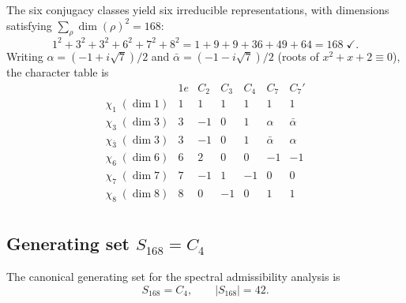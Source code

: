 \documentclass[11pt,a4paper]{article}
\begin{document}
    The six conjugacy classes yield six irreducible representations, with dimensions
    satisfying $\sum_\rho \dim(\rho)^2 = 168$:
    \begin{equation}
      1^2 + 3^2 + 3^2 + 6^2 + 7^2 + 8^2 = 1 + 9 + 9 + 36 + 49 + 64 = 168 \;\checkmark.
      \label{eq:sigma168-dim-check}
    \end{equation}
    Writing $\alpha = (-1 + i\sqrt{7})/2$ and $\bar\alpha = (-1 - i\sqrt{7})/2$
    (roots of $x^2 + x + 2 \equiv 0$), the character table is
    \begin{equation}
      \renewcommand{\arraystretch}{1.35}
      \begin{array}{l|rrrrrr}
        & 1e & C_2 & C_3 & C_4 & C_7 & C_7' \\
        \hline
        \chi_1\;(\dim 1) & 1 &  1 &  1 &  1 &  1 &  1 \\
        \chi_3\;(\dim 3) & 3 & -1 &  0 &  1 & \alpha & \bar\alpha \\
        \chi_{\bar 3}\;(\dim 3) & 3 & -1 &  0 &  1 & \bar\alpha & \alpha \\
        \chi_6\;(\dim 6) & 6 &  2 &  0 &  0 & -1 & -1 \\
        \chi_7\;(\dim 7) & 7 & -1 &  1 & -1 &  0 &  0 \\
        \chi_8\;(\dim 8) & 8 &  0 & -1 &  0 &  1 &  1 \\
      \end{array}
      \label{eq:CT-sigma168}
    \end{equation}

  \subsection{Generating set $S_{168} = C_4$}
    \label{sec:sigma168-genset}

    The canonical generating set for the spectral admissibility analysis is
    \begin{equation}
      S_{168} = C_4,
      \qquad |S_{168}| = 42.
      \label{eq:S168}
    \end{equation}
\end{document}
